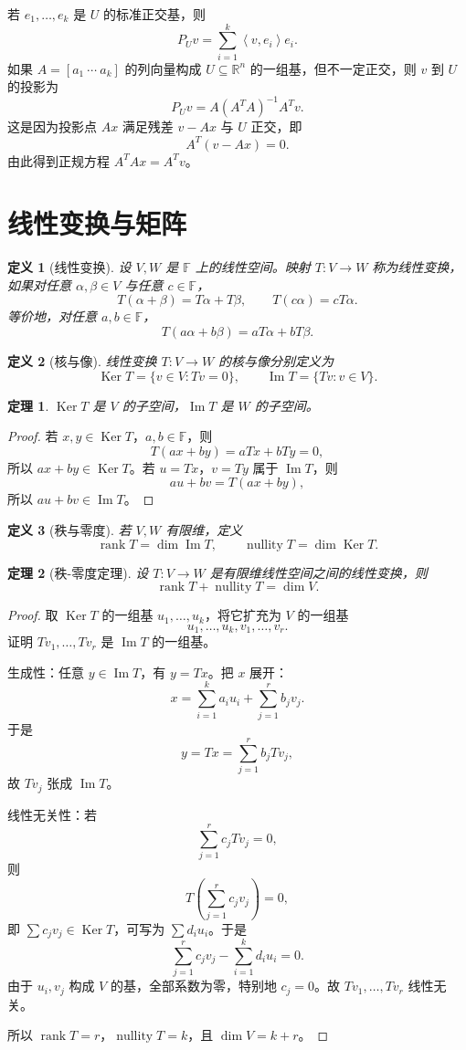 \documentclass[UTF8,openany,zihao=-4]{ctexbook}
\theoremstyle{cnplain}
\newtheorem{definition}{定义}[chapter]
\newtheorem{theorem}{定理}[chapter]
\newcommand{\F}{\mathbb F}
\newcommand{\R}{\mathbb R}
\newcommand{\rank}{\operatorname{rank}}
\newcommand{\Ker}{\operatorname{Ker}}
\newcommand{\Img}{\operatorname{Im}}
\newcommand{\nullity}{\operatorname{nullity}}
\newcommand{\inner}[2]{\left\langle #1,#2\right\rangle}
\begin{document}
若 $e_1,
\ldots,e_k$ 是 $U$ 的标准正交基，则
\[
P_Uv=\sum_{i=1}^k\inner{v}{e_i}e_i.
\]
如果 $A=[a_1\ \cdots\ a_k]$ 的列向量构成 $U\subseteq\R^n$ 的一组基，但不一定正交，则 $v$ 到 $U$ 的投影为
\[
P_Uv=A(A^TA)^{-1}A^Tv.
\]
这是因为投影点 $Ax$ 满足残差 $v-Ax$ 与 $U$ 正交，即
\[
A^T(v-Ax)=0.
\]
由此得到正规方程 $A^TAx=A^Tv$。

\section{线性变换与矩阵}

\begin{definition}[线性变换]
设 $V,W$ 是 $\F$ 上的线性空间。映射 $T:V\to W$ 称为线性变换，如果对任意 $\alpha,
\beta\in V$ 与任意 $c\in\F$，
\[
T(\alpha+\beta)=T\alpha+T\beta,
\qquad T(c\alpha)=cT\alpha.
\]
等价地，对任意 $a,b\in\F$，
\[
T(a\alpha+b\beta)=aT\alpha+bT\beta.
\]
\end{definition}

\begin{definition}[核与像]
线性变换 $T:V\to W$ 的核与像分别定义为
\[
\Ker T=\{v\in V:T v=0\},
\qquad
\Img T=\{T v:v\in V\}.
\]
\end{definition}

\begin{theorem}
$\Ker T$ 是 $V$ 的子空间，$\Img T$ 是 $W$ 的子空间。
\end{theorem}

\begin{proof}
若 $x,y\in\Ker T$，$a,b\in\F$，则
\[
T(ax+by)=aTx+bTy=0,
\]
所以 $ax+by\in\Ker T$。若 $u=Tx$，$v=Ty$ 属于 $\Img T$，则
\[
au+bv=T(ax+by),
\]
所以 $au+bv\in\Img T$。
\end{proof}

\begin{definition}[秩与零度]
若 $V,W$ 有限维，定义
\[
\rank T=\dim\Img T,
\qquad
\nullity T=\dim\Ker T.
\]
\end{definition}

\begin{theorem}[秩-零度定理]
设 $T:V\to W$ 是有限维线性空间之间的线性变换，则
\[
\rank T+\nullity T=\dim V.
\]
\end{theorem}

\begin{proof}
取 $\Ker T$ 的一组基 $u_1,
\ldots,u_k$，将它扩充为 $V$ 的一组基
\[
u_1,
\ldots,u_k,v_1,
\ldots,v_r.
\]
证明 $Tv_1,
\ldots,Tv_r$ 是 $\Img T$ 的一组基。

生成性：任意 $y\in\Img T$，有 $y=Tx$。把 $x$ 展开：
\[
x=\sum_{i=1}^k a_i u_i+
\sum_{j=1}^r b_j v_j.
\]
于是
\[
y=Tx=\sum_{j=1}^r b_jTv_j,
\]
故 $Tv_j$ 张成 $\Img T$。

线性无关性：若
\[
\sum_{j=1}^r c_jTv_j=0,
\]
则
\[
T\left(\sum_{j=1}^r c_jv_j\right)=0,
\]
即 $\sum c_jv_j\in\Ker T$，可写为 $\sum d_i u_i$。于是
\[
\sum_{j=1}^r c_jv_j-
\sum_{i=1}^k d_iu_i=0.
\]
由于 $u_i,v_j$ 构成 $V$ 的基，全部系数为零，特别地 $c_j=0$。故 $Tv_1,
\ldots,Tv_r$ 线性无关。

所以 $\rank T=r$，$\nullity T=k$，且 $\dim V=k+r$。
\end{proof}
\end{document}
